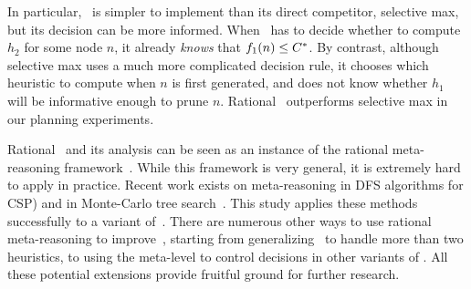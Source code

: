 In particular, \rationallazyastar~is simpler to implement than its direct
competitor, selective max, but its decision can be more informed.  When
\rationallazyastar~has to decide whether to compute $h_2$ for some node
$n$, it already {\em knows} that $f_1(n) \leq C^\ast$.  By contrast,
although selective max uses a much more complicated decision rule, it
chooses which heuristic to compute when $n$ is first generated, and does
not know whether $h_1$ will be informative enough to prune $n$. Rational
\lazyastar~outperforms selective max in our planning experiments.

Rational \lazyastar~and its analysis can be seen as an instance of the
rational meta-reasoning framework~\cite{Russell.right}. While
this framework is very general, it is extremely hard to
apply in practice. Recent work exists on meta-reasoning in DFS
algorithms for CSP) \cite{TolpinShimony.csp} and in Monte-Carlo tree
search~\cite{HayRussellTolpinShimony.selecting}. This study applies these
methods successfully to a variant of~\astar.  There are numerous other
ways to use rational meta-reasoning to improve~\astar, starting from
generalizing \rationallazyastar~to handle more than two heuristics, to
using the meta-level to control decisions in other variants of \astar. All
these potential extensions provide fruitful ground for further research.
